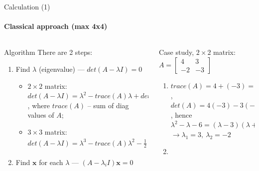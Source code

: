 \documentclass[aspectratio=169]{beamer}
\begin{document}
\begin{frame}[t]{Calculation (1)}
    \framesubtitle{Classical approach (max 4x4)}
    \vspace{-0.8cm}
    \begin{columns}[T,onlytextwidth]
        \begin{column}{0.48\textwidth}
            \begin{block}{Algorithm}
            There are 2 steps:
            \begin{enumerate}
                \item Find $\lambda$ (eigenvalue) --- $det(A-\lambda I)=0$
                \begin{itemize}
                    \item $2\times2$ matrix: $det(A-\lambda I) = \lambda^2 - trace(A)\lambda + det(A) = 0$, where $trace(A)$ -- sum of diag values of $A$;
                    \item $3\times3$ matrix: $det(A-\lambda I) = \lambda^3 - trace(A)\lambda^2 - \frac{1}{2}(trace(A^2)-trace(A)^2)\lambda - det(A) = 0$ 
                \end{itemize}
                \item Find $\mathbf{x}$ for each $\lambda$ --- $(A-\lambda_i I)\mathbf{x} = 0 $
            \end{enumerate}
        \end{block}
        \end{column}
        \begin{column}{0.49\textwidth}
            \begin{example}
            Case study, $2\times 2$ matrix: $A= \begin{bmatrix}
            4 & 3\\ 
            -2 & -3 
            \end{bmatrix}$
        \begin{enumerate}
            \item $trace(A)= 4 + (-3)=1$, $det(A) = 4(-3) - 3(-2)=-6$, hence \\
            $\lambda^2 - \lambda - 6 = (\lambda-3)(\lambda+2),\ \rightarrow$ \\ $\rightarrow \lambda_1 = 3,\ \lambda_2=-2$
            \item 
\end{enumerate}
\end{example}
\end{column}
\end{columns}
\end{frame}
\end{document}
